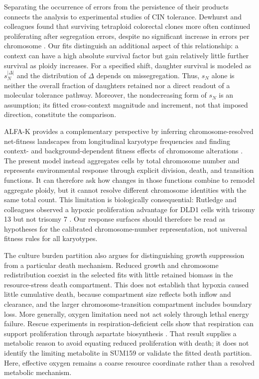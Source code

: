 \documentclass[11pt]{article}
\let\cite\supercite
\begin{document}
Separating the occurrence of errors from the persistence of their products connects the analysis to experimental studies of CIN tolerance. Dewhurst and colleagues found that surviving tetraploid colorectal clones more often continued proliferating after segregation errors, despite no significant increase in errors per chromosome \cite{dewhurst_tolerance_2014}. Our fits distinguish an additional aspect of this relationship: a context can have a high absolute survival factor but gain relatively little further survival as ploidy increases. For a specified shift, daughter survival is modeled as $s_N^{|\Delta|}$ and the distribution of $\Delta$ depends on missegregation. Thus, $s_N$ alone is neither the overall fraction of daughters retained nor a direct readout of a molecular tolerance pathway. Moreover, the nondecreasing form of $s_N$ is an assumption; its fitted cross-context magnitude and increment, not that imposed direction, constitute the comparison.

ALFA-K provides a complementary perspective by inferring chromosome-resolved net-fitness landscapes from longitudinal karyotype frequencies and finding context- and background-dependent fitness effects of chromosome alterations \cite{beck_alfa-k_2026}. The present model instead aggregates cells by total chromosome number and represents environmental response through explicit division, death, and transition functions. It can therefore ask how changes in those functions combine to remodel aggregate ploidy, but it cannot resolve different chromosome identities with the same total count. This limitation is biologically consequential: Rutledge and colleagues observed a hypoxic proliferation advantage for DLD1 cells with trisomy 13 but not trisomy 7 \cite{rutledge_selective_2016}. Our response surfaces should therefore be read as hypotheses for the calibrated chromosome-number representation, not universal fitness rules for all karyotypes.

The culture burden partition also argues for distinguishing growth suppression from a particular death mechanism. Reduced growth and chromosome redistribution coexist in the selected fits with little retained biomass in the resource-stress death compartment. This does not establish that hypoxia caused little cumulative death, because compartment size reflects both inflow and clearance, and the larger chromosome-transition compartment includes boundary loss. More generally, oxygen limitation need not act solely through lethal energy failure. Rescue experiments in respiration-deficient cells show that respiration can support proliferation through aspartate biosynthesis \cite{sullivan_supporting_2015}. That result supplies a metabolic reason to avoid equating reduced proliferation with death; it does not identify the limiting metabolite in SUM159 or validate the fitted death partition. Here, effective oxygen remains a coarse resource coordinate rather than a resolved metabolic mechanism.
\end{document}

